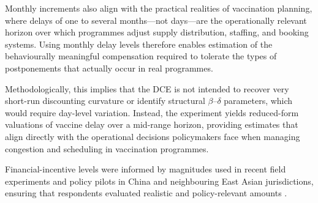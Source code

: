 \documentclass[doublespacing]{utdthesis}
\let\cite=\citep
\begin{document}
Monthly increments also align with the practical realities of vaccination planning, where delays of one to several months---not days---are the operationally relevant horizon over which programmes adjust supply distribution, staffing, and booking systems. Using monthly delay levels therefore enables estimation of the behaviourally meaningful compensation required to tolerate the types of postponements that actually occur in real programmes.

Methodologically, this implies that the DCE is not intended to recover very short-run discounting curvature or identify structural $\beta$--$\delta$ parameters, which would require day-level variation. Instead, the experiment yields reduced-form valuations of vaccine delay over a mid-range horizon, providing estimates that align directly with the operational decisions policymakers face when managing congestion and scheduling in vaccination programmes.

Financial-incentive levels were informed by magnitudes used in recent field experiments
and policy pilots in China and neighbouring East Asian jurisdictions, ensuring that respondents
evaluated realistic and policy-relevant amounts \cite{CamposMercade2021,Zhang2023,Thirumurthy2022}.
\end{document}
